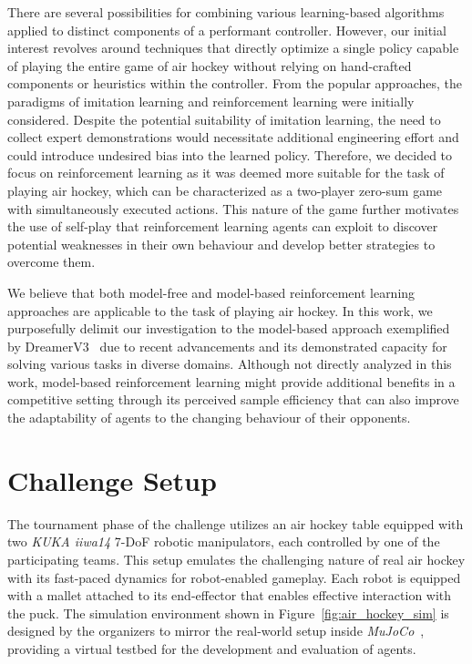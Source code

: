 \documentclass{article}
\begin{document}
There are several possibilities for combining various learning-based algorithms applied to distinct components of a performant controller. However, our initial interest revolves around techniques that directly optimize a single policy capable of playing the entire game of air hockey without relying on hand-crafted components or heuristics within the controller. From the popular approaches, the paradigms of imitation learning and reinforcement learning were initially considered. Despite the potential suitability of imitation learning, the need to collect expert demonstrations would necessitate additional engineering effort and could introduce undesired bias into the learned policy. Therefore, we decided to focus on reinforcement learning as it was deemed more suitable for the task of playing air hockey, which can be characterized as a two-player zero-sum game with simultaneously executed actions. This nature of the game further motivates the use of self-play that reinforcement learning agents can exploit to discover potential weaknesses in their own behaviour and develop better strategies to overcome them.

We believe that both model-free and model-based reinforcement learning approaches are applicable to the task of playing air hockey. In this work, we purposefully delimit our investigation to the model-based approach exemplified by DreamerV3~\cite{hafner2023mastering} due to recent advancements and its demonstrated capacity for solving various tasks in diverse domains. Although not directly analyzed in this work, model-based reinforcement learning might provide additional benefits in a competitive setting through its perceived sample efficiency that can also improve the adaptability of agents to the changing behaviour of their opponents.

\section{Challenge Setup}\label{sec:challenge-setup}

The tournament phase of the challenge utilizes an air hockey table equipped with two \textit{KUKA iiwa14} \mbox{7-DoF} robotic manipulators, each controlled by one of the participating teams. This setup emulates the challenging nature of real air hockey with its fast-paced dynamics for robot-enabled gameplay. Each robot is equipped with a mallet attached to its end-effector that enables effective interaction with the puck. The simulation environment shown in Figure~\ref{fig:air_hockey_sim} is designed by the organizers to mirror the real-world setup inside \textit{MuJoCo}~\cite{todorov2012mujoco}, providing a virtual testbed for the development and evaluation of agents.
\end{document}
